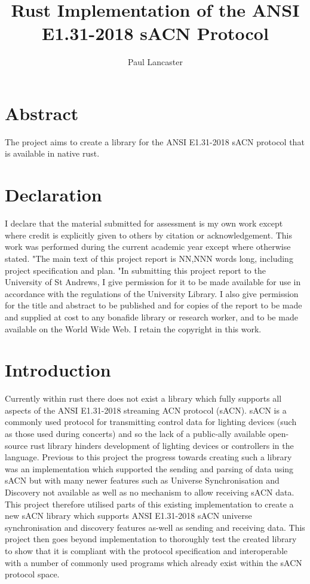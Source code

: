 \documentclass[11pt,a4paper]{article}
\author{Paul Lancaster}
\title{Rust Implementation of the ANSI E1.31-2018 sACN Protocol}
\begin{document}


\section{Abstract}
The project aims to create a library for the ANSI E1.31-2018 sACN protocol \cite{ANSI_E1.31} that is available in native rust.

\section{Declaration}
I declare that the material submitted for
assessment is my own work except where credit is
explicitly given to others by citation or
acknowledgement. This work was performed during
the current academic year except where otherwise
stated.
"The main text of this project report is NN,NNN
words long, including project specification and plan.
"In submitting this project report to the University of
St Andrews, I give permission for it to be made
available for use in accordance with the regulations of the University Library. I also give permission for
the title and abstract to be published and for copies of the report to be made and supplied at cost to any bonafide library or research worker, and to be made
available on the World Wide Web. I retain the
copyright in this work.

\pagebreak
\tableofcontents
\pagebreak

\section{Introduction}
Currently within rust there does not exist a library which fully supports all aspects of the ANSI E1.31-2018 streaming ACN protocol \cite{ANSI_E1.31} (sACN). sACN is a commonly used protocol for transmitting control data for lighting devices (such as those used during concerts) and so the lack of a public-ally available open-source rust library hinders development of lighting devices or controllers in the language. Previous to this project the progress towards creating such a library was an implementation \cite{ORIGINAL_IMPL} which supported the sending and parsing of data using sACN but with many newer features such as Universe Synchronisation and Discovery not available as well as no mechanism to allow receiving sACN data. This project therefore utilised parts of this existing implementation to create a new sACN library which supports ANSI E1.31-2018 sACN universe synchronisation and discovery features as-well as sending and receiving data. This project then goes beyond implementation to thoroughly test the created library to show that it is compliant with the protocol specification and interoperable with a number of commonly used programs which already exist within the sACN protocol space. \\
\end{document}
